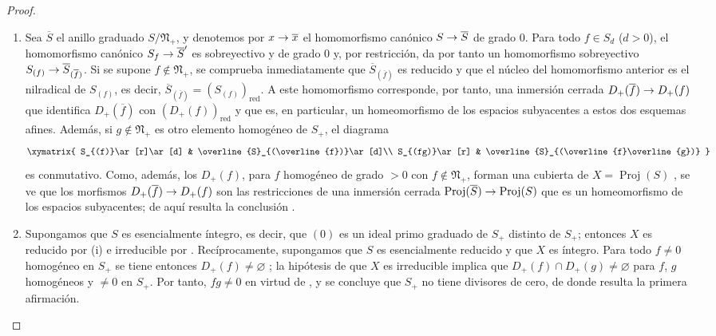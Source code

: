 \documentclass[oneside,10pt]{amsart}
\makeatletter
\newcommand{\ega@arrow}[2]{\mathchoice{#1}{#2}{#2}{#2}}
\renewcommand{\to}{\ega@arrow{\longrightarrow}{\rightarrow}}
\makeatother
\begin{document}
\begin{proof}
\medskip\noindent
\begin{enumerate}
  \item[\rm(i)] Sea $\overline{S}$ el anillo graduado $S/\mathfrak{N}_+$, y denotemos por $x\to\overline{x}$ el homomorfismo canónico $S\to\overline{S}$ de grado $0$.
  Para todo $f\in S_d$ ($d>0$), el homomorfismo canónico $S_f\to\overline{S}'$  es sobreyectivo y de grado $0$ y, por restricción, da por tanto un homomorfismo sobreyectivo $S_{(f)}\to\overline{S}_{(\overline{f})}$.
  Si se supone $f\notin\mathfrak{N}_+$, se comprueba inmediatamente que $\overline{S}_{(\overline{f})}$ es reducido y que el núcleo del homomorfismo anterior es el nilradical de $S_{(f)}$, es decir,
  $\overline{S}_{(\overline{f})}=(S_{(f)})_{\mathrm{red}}$.
  A este homomorfismo corresponde, por tanto, una inmersión cerrada $D_+(\overline{f})\to D_+(f)$ que identifica $D_+(\overline{f})$ con $(D_+(f))_{\mathrm{red}}$  y que es, en particular, un homeomorfismo de los espacios subyacentes a estos dos esquemas afines.
  Además, si $g\notin\mathfrak{N}_+$ es otro elemento homogéneo de $S_+$, el diagrama
  \[
      \xymatrix{
        S_{(f)}\ar[r]\ar[d]
        & \overline{S}_{(\overline{f})}\ar[d]\\
        S_{(fg)}\ar[r]
        & \overline{S}_{(\overline{f}\overline{g})}
      }
    \]
  es conmutativo.
  Como, además, los $D_+(f)$, para $f$ homogéneo de grado $>0$ con $f\notin\mathfrak{N}_+$, forman una cubierta de $X=\operatorname{Proj}(S)$ , se ve que los morfismos $D_+(\overline{f})\to D_+(f)$ son las restricciones de una inmersión cerrada $\operatorname{Proj}(\overline{S})\to\operatorname{Proj}(S)$ que es un homeomorfismo de los espacios subyacentes; de aquí resulta la conclusión .
  \item[\rm(ii)] Supongamos que $S$ es esencialmente íntegro, es decir, que $(0)$ es un ideal primo graduado de $S_+$ distinto de $S_+$; entonces $X$ es reducido por (i) e irreducible por .
  Recíprocamente, supongamos que $S$ es esencialmente reducido y que $X$ es íntegro.
  Para todo $f\neq0$ homogéneo en $S_+$ se tiene entonces $D_+(f)\neq\varnothing$ ; la hipótesis de que $X$ es irreducible implica que $D_+(f)\cap D_+(g)\neq\varnothing$ para $f$, $g$ homogéneos y $\neq0$ en $S_+$.
  Por tanto, $fg\neq0$ en virtud de , y se concluye que $S_+$ no tiene divisores de cero, de donde resulta la primera afirmación.
\end{enumerate}
\end{proof}
\end{document}
